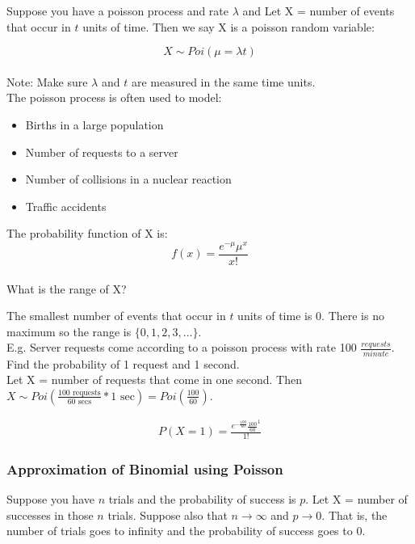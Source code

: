 \documentclass[12pt, letterpaper]{article}
\begin{document}
Suppose you have a poisson process and rate \(\lambda\) and Let X = number of events that occur in \(t\) units of time. Then we say X is a poisson random variable:

\begin{equation}
X \sim Poi(\mu = \lambda t)
\end{equation}\\

Note: Make sure \(\lambda\) and \(t\) are measured in the same time units.\\

The poisson process is often used to model:
\begin{itemize}
\item Births in a large population
\item Number of requests to a server
\item Number of collisions in a nuclear reaction
\item Traffic accidents
\end{itemize}

The probability function of X is:
\begin{equation}
f\left(x\right) = \frac{e^{-\mu}\mu^x}{x!}
\end{equation}\\

What is the range of X?

The smallest number of events that occur in \(t\) units of time is 0. There is no maximum so the range is \(\{0, 1, 2, 3, ...\}\).\\

E.g. Server requests come according to a poisson process with rate 100 \(\frac{requests}{minute}\). Find the probability of 1 request and 1 second.\\

Let X = number of requests that come in one second. Then \(X \sim Poi(\frac{\text{100 requests}}{\text{60 secs}} * 1 \text{ sec}) = Poi(\frac{100}{60})\).

\begin{align*}
P\left(X = 1\right) = \frac{e^{-\frac{100}{60}} \frac{100}{60}^1}{1!}
\end{align*}

\subsubsection{Approximation of Binomial using Poisson}
Suppose you have \(n\) trials and the probability of success is \(p\). Let X = number of successes in those \(n\) trials. Suppose also that \(n \rightarrow \infty\) and \(p \rightarrow 0\). That is, the number of trials goes to infinity and the probability of success goes to 0. \\
\end{document}
